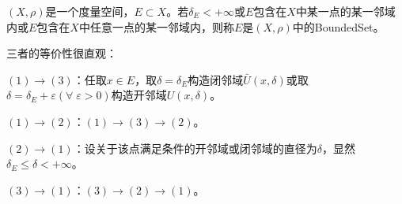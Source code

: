 \begin{definition}
	$(X,\rho)$是一个度量空间，$E\subset X$。若$\delta_E<+\infty$或$E$包含在$X$中某一点的某一邻域内或$E$包含在$X$中任意一点的某一邻域内，则称$E$是$(X,\rho)$中的\gls{BoundedSet}。
\end{definition}
\begin{note}
	三者的等价性很直观：\par
	$(1)\to(3)$：任取$x\in E$，取$\delta=\delta_E$构造闭邻域$\bar{U}(x,\delta)$或取$\delta=\delta_E+\varepsilon(\forall\;\varepsilon>0)$构造开邻域$U(x,\delta)$。\par
	$(1)\to(2)$：$(1)\to(3)\to(2)$。\par
	$(2)\to(1)$：设关于该点满足条件的开邻域或闭邻域的直径为$\delta$，显然$\delta_E\leqslant\delta<+\infty$。\par 
	$(3)\to(1)$：$(3)\to(2)\to(1)$。
\end{note}

